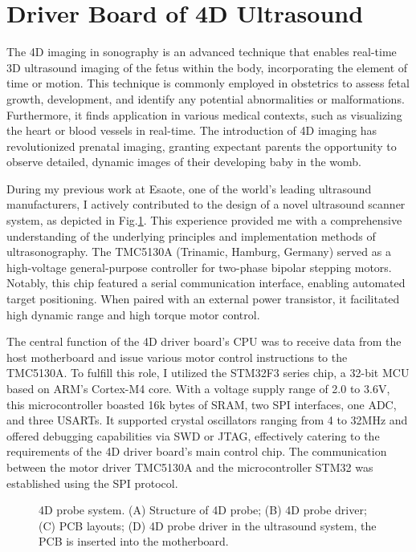 \documentclass[
    ngerman,american
    ]{scrartcl}
\begin{document}
    

\section{Driver Board of 4D Ultrasound}


The 4D imaging in sonography is an advanced technique that enables real-time 3D ultrasound imaging of the fetus within the body, incorporating the element of time or motion. This technique is commonly employed in obstetrics to assess fetal growth, development, and identify any potential abnormalities or malformations. Furthermore, it finds application in various medical contexts, such as visualizing the heart or blood vessels in real-time. The introduction of 4D imaging has revolutionized prenatal imaging, granting expectant parents the opportunity to observe detailed, dynamic images of their developing baby in the womb.

During my previous work at Esaote, one of the world's leading ultrasound manufacturers, I actively contributed to the design of a novel ultrasound scanner system, as depicted in Fig.\ref{4DPCB}. This experience provided me with a comprehensive understanding of the underlying principles and implementation methods of ultrasonography. The TMC5130A (Trinamic, Hamburg, Germany) served as a high-voltage general-purpose controller for two-phase bipolar stepping motors. Notably, this chip featured a serial communication interface, enabling automated target positioning. When paired with an external power transistor, it facilitated high dynamic range and high torque motor control.

The central function of the 4D driver board's CPU was to receive data from the host motherboard and issue various motor control instructions to the TMC5130A. To fulfill this role, I utilized the STM32F3 series chip, a 32-bit MCU based on ARM's Cortex-M4 core. With a voltage supply range of 2.0 to 3.6V, this microcontroller boasted 16k bytes of SRAM, two SPI interfaces, one ADC, and three USARTs. It supported crystal oscillators ranging from 4 to 32MHz and offered debugging capabilities via SWD or JTAG, effectively catering to the requirements of the 4D driver board's main control chip. The communication between the motor driver TMC5130A and the microcontroller STM32 was established using the SPI protocol.




\begin{figure}[H]
	
	\caption{4D probe system. (A) Structure of 4D probe; (B) 4D probe driver; (C) PCB layouts; (D) 4D probe driver in the ultrasound system, the PCB is inserted into the motherboard.}
	\label{4DPCB}
\end{figure}  
\end{document}
